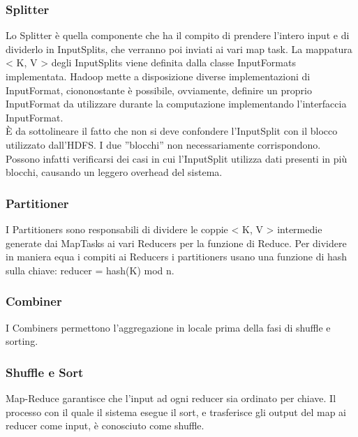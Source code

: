 \subsubsection{Splitter}
Lo Splitter è quella componente che ha il compito di prendere l’intero input e di dividerlo in InputSplits, che verranno poi inviati ai vari map task. La mappatura < K, V > degli InputSplits viene definita dalla classe InputFormats implementata. Hadoop mette a disposizione diverse implementazioni di InputFormat, ciononostante è possibile, ovviamente, definire un proprio InputFormat da utilizzare durante la computazione implementando l’interfaccia InputFormat. \\
È da sottolineare il fatto che non si deve confondere l’InputSplit con il blocco utilizzato dall’HDFS. I due ”blocchi” non necessariamente corrispondono. Possono infatti verificarsi dei casi in cui l’InputSplit utilizza dati presenti in più blocchi, causando un leggero overhead del sistema.
\subsubsection{Partitioner}
I Partitioners sono responsabili di dividere le coppie < K, V > intermedie generate dai MapTasks ai vari Reducers per la funzione di Reduce. Per dividere in maniera equa i compiti ai Reducers i partitioners usano una funzione di hash sulla chiave: reducer = hash(K) mod n.
\subsubsection{Combiner}
I Combiners permettono l'aggregazione in locale prima della fasi di shuffle e sorting.
\subsubsection{Shuffle e Sort}
Map-Reduce garantisce che l'input ad ogni reducer sia ordinato per chiave. Il processo con il quale il sistema esegue il sort, e trasferisce gli output del map ai reducer come input, è conosciuto come shuffle.
